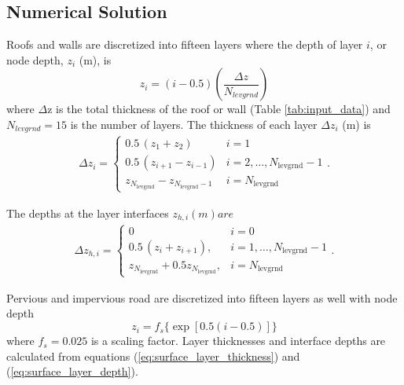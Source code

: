 \documentclass[12pt,authoryear]{elsarticle}
\numberwithin{equation}{section} %
\begin{document}
\subsection{Numerical Solution}
\label{eq:numerical_solution}
%
Roofs and walls are discretized into fifteen layers where the depth of layer $i$, or node depth, $z_{i}$ (m), is
\begin{equation}
\label{eq:layers}
z_{i}=(i-0.5)\left(\frac{\Delta z}{N_{levgrnd}}\right)
\end{equation}
where $\Delta$z is the total thickness of the roof or wall (Table \ref{tab:input_data}) and $N_{levgrnd}=15$ is the number of layers. The thickness of each layer $\Delta z_{i}$ (m) is 
\begin{equation}
\label{eq:surface_layer_thickness}
\begin{aligned}
\Delta z_i = 
\begin{cases}
0.5\,(z_1 + z_2) & i = 1 \\
0.5\,(z_{i+1} - z_{i-1}) & i = 2, \ldots, N_{\text{levgrnd}} - 1 \\
z_{N_{\text{levgrnd}}} - z_{N_{\text{levgrnd}} - 1} & i = N_{\text{levgrnd}}
\end{cases}.
\end{aligned}
\end{equation}

The depths at the layer interfaces $z_{h,i} (m) are$
\begin{equation}
\label{eq:surface_layer_depth}
\begin{aligned}
\Delta z_{h,i} = 
\begin{cases}
0 & i = 0 \\
0.5\,(z_{i} + z_{i+1}), & i = 1, \ldots, N_{\text{levgrnd}} - 1 \\
z_{N_{\text{levgrnd}}} +0.5 z_{N_{\text{levgrnd}}}, & i = N_{\text{levgrnd}}
\end{cases}.
\end{aligned}
\end{equation}

Pervious and impervious road are discretized into fifteen layers as well with node depth 
\begin{equation}
z_{i}=f_{s}\{\exp{\left[0.5(i-0.5)\right]}\}
\end{equation}
where $f_{s}=0.025$ is a scaling factor. Layer thicknesses and interface depths are calculated from equations (\ref{eq:surface_layer_thickness}) and (\ref{eq:surface_layer_depth}).
\end{document}
